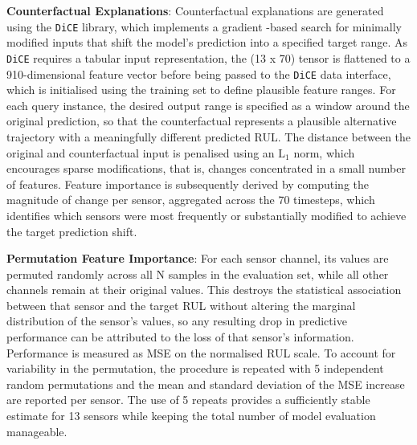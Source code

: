 \textbf{Counterfactual Explanations}: Counterfactual explanations are generated using the \texttt{DiCE} library, which implements a gradient -based search for minimally modified inputs that shift the model's prediction into a specified target range. As \texttt{DiCE} requires a tabular input representation, the (13 x 70) tensor is flattened to a 910-dimensional feature vector before being passed to the \texttt{DiCE} data interface, which is initialised using the training set to define plausible feature ranges. For each query instance, the desired output range is specified as a window around the original prediction, so that the counterfactual represents a plausible alternative trajectory with a meaningfully different predicted RUL. The distance between the original and counterfactual input is penalised using an $\text{L}_1$ norm, which encourages sparse modifications, that is, changes concentrated in a small number of features. Feature importance is subsequently derived by computing the magnitude of change per sensor, aggregated across the 70 timesteps, which identifies which sensors were most frequently or substantially modified to achieve the target prediction shift.

\textbf{Permutation Feature Importance}: For each sensor channel, its values are permuted randomly across all N samples in the evaluation set, while all other channels remain at their original values. This destroys the statistical association between that sensor and the target RUL without altering the marginal distribution of the sensor's values, so any resulting drop in predictive performance can be attributed to the loss of that sensor's information. Performance is measured as MSE on the normalised RUL scale. To account for variability in the permutation, the procedure is repeated with 5 independent random permutations and the mean and standard deviation of the MSE increase are reported per sensor. The use of 5 repeats provides a sufficiently stable estimate for 13 sensors while keeping the total number of model evaluation manageable.

